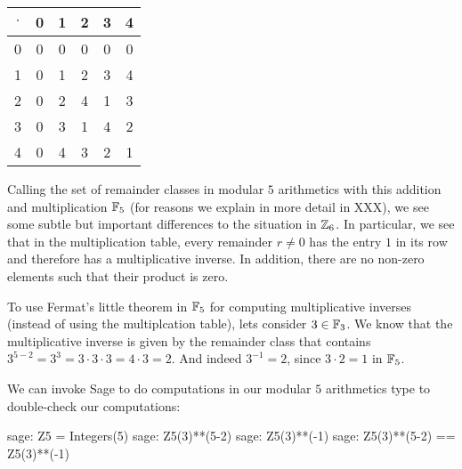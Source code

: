 \begin{example} 
\begin{center}
\begin{tabular}{c | c c c c c}
$ \cdot $ & 0 & 1 & 2 & 3 & 4 \\\hline
      0 & 0 & 0 & 0 & 0 & 0 \\
      1 & 0 & 1 & 2 & 3 & 4 \\
      2 & 0 & 2 & 4 & 1 & 3 \\
      3 & 0 & 3 & 1 & 4 & 2 \\
      4 & 0 & 4 & 3 & 2 & 1 \\
  \end{tabular}
\end{center}
Calling the set of remainder classes in modular $5$ arithmetics with this addition and multiplication $\mathbb{F}_5$ (for reasons we explain in more detail in XXX), we see some subtle but important differences to the situation in $\mathbb{Z}_6$. In particular, we see that in the multiplication table, every remainder $r\neq 0$ has the entry $1$ in its row and therefore has a multiplicative inverse. In addition, there are no non-zero elements such that their product is zero.

To use Fermat's little theorem in $\mathbb{F}_5$ for computing multiplicative inverses (instead of using the multiplcation table), lets consider $3\in\mathbb{F}_3$. We know that the multiplicative inverse is given by the remainder class that contains $3^{5-2}=3^3=3\cdot 3\cdot 3= 4\cdot 3 = 2$. And indeed $3^{-1}=2$, since $3\cdot 2 =1$ in $\mathbb{F}_5$.

We can invoke Sage to do computations in our modular $5$ arithmetics type to double-check our computations:
\begin{sagecommandline}
sage: Z5 = Integers(5)
sage: Z5(3)**(5-2)
sage: Z5(3)**(-1)
sage: Z5(3)**(5-2) == Z5(3)**(-1)
\end{sagecommandline}
\end{example}

